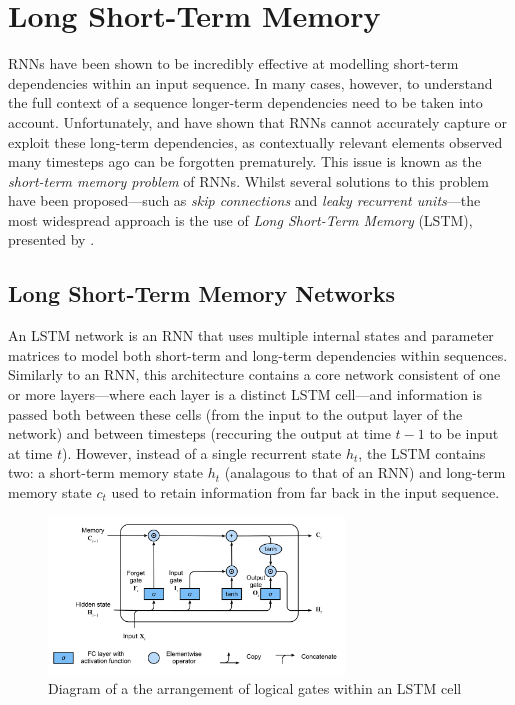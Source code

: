 \documentclass[a4paper, 11pt]{report}
\begin{document}
    \section{Long Short-Term Memory}

    RNNs have been shown to be incredibly effective at modelling short-term dependencies within an input sequence. In many cases, however, to understand the full context of a sequence longer-term dependencies need to be taken into account. Unfortunately, \citet{hochreiter-1991} and \citet{bengio-1994} have shown that RNNs cannot accurately capture or exploit these long-term dependencies, as contextually relevant elements observed many timesteps ago can be forgotten prematurely. This issue is known as the \emph{short-term memory problem} of RNNs. Whilst several solutions to this problem have been proposed---such as \emph{skip connections} and \emph{leaky recurrent units}---the most widespread approach is the use of \emph{Long Short-Term Memory} (LSTM), presented by \citet{hochreiter-1997}.


    \subsection{Long Short-Term Memory Networks}

    An LSTM network is an RNN that uses multiple internal states and parameter matrices to model both short-term and long-term dependencies within sequences. Similarly to an RNN, this architecture contains a core network consistent of one or more layers---where each layer is a distinct LSTM cell---and information is passed both between these cells (from the input to the output layer of the network) and between timesteps (reccuring the output at time $t-1$ to be input at time $t$). However, instead of a single recurrent state $h_t$, the LSTM contains two: a short-term memory state $h_t$ (analagous to that of an RNN) and long-term memory state $c_t$ used to retain information from far back in the input sequence.

    \begin{figure}[ht]
        \centering
        \includegraphics[width=0.7\textwidth]{lstm.png}
        \caption{\centering Diagram of a the arrangement of logical gates within an LSTM cell \citep{zhang-2021}}
        \label{fig: lstm}
    \end{figure}
\end{document}
